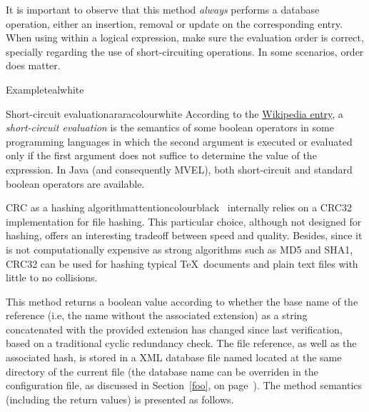 \begin{description}
\vspace{1.4em}

It is important to observe that this method \emph{always} performs a database operation, either an insertion, removal or update on the corresponding entry. When using  within a logical expression, make sure the evaluation order is correct, specially regarding the use of short-circuiting operations. In some scenarios, order does matter.

\begin{codebox}{Example}{teal}{\icnote}{white}
\end{codebox}

\begin{messagebox}{Short-circuit evaluation}{araracolour}{\icok}{white}
According to the \href{https://en.wikipedia.org/wiki/Short-circuit_evaluation}{Wikipedia entry}, a \emph{short-circuit evaluation} is the semantics of some boolean operators in some programming languages in which the second argument is executed or evaluated only if the first argument does not suffice to determine the value of the expression. In Java (and consequently MVEL), both short-circuit and standard boolean operators are available.
\end{messagebox}

\begin{messagebox}{CRC as a hashing algorithm}{attentioncolour}{\icattention}{black}
\arara\ internally relies on a CRC32 implementation for file hashing. This particular choice, although not designed for hashing, offers an interesting tradeoff between speed and quality. Besides, since it is not computationally expensive as strong algorithms such as MD5 and SHA1, CRC32 can be used for hashing typical \TeX\ documents and plain text files with little to no collisions.
\end{messagebox}

\item[\mddbox{C}{R}{changed(String extension)}{boolean}] This method returns a boolean value according to whether the base name of the  reference (i.e, the name without the associated extension) as a string concatenated with the provided  extension has changed since last verification, based on a traditional cyclic redundancy check. The file reference, as well as the associated hash, is stored in a XML database file named  located at the same directory of the current file (the database name can be overriden in the configuration file, as discussed in Section~\ref{foo}, on page~\pageref{foo}). The method semantics (including the return values) is presented as follows.


\end{description}
